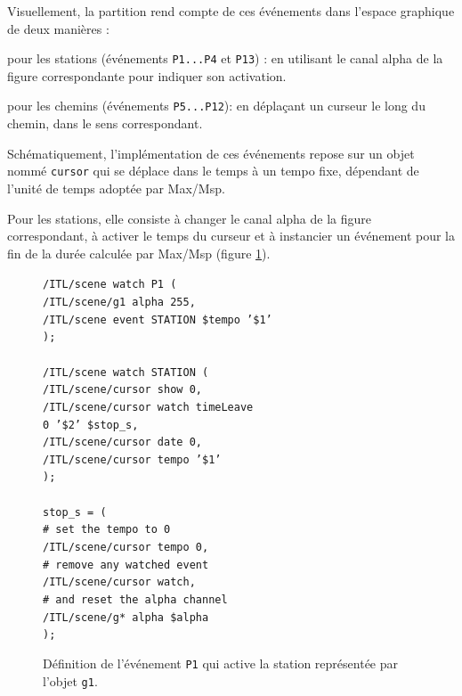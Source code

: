 \documentclass{article}
\newcommand{\OSC}[1]	{{\fontsize{9pt}{9pt} \selectfont\texttt{#1}}}
\let\olditemize\itemize
\let\oldenditemize\enditemize
\renewenvironment{itemize} 	{\olditemize \renewcommand{\labelitemi}{$\bullet$} \setlength{\itemsep}{0mm}}{\oldenditemize}
\newcommand{\sample}[1]		{\vspace{-0.2em}\begin{center}\colorbox{mygrey}{\begin{minipage}[t]{0.98\columnwidth} {\small \texttt{#1}}\end{minipage}}\end{center}}
\begin{document}
\vspace{2mm}
Visuellement, la partition rend compte de ces événements dans l'espace graphique de deux manières :
\begin{itemize}
\item pour les stations (événements \OSC{P1...P4} et \OSC{P13}) : en utilisant le canal alpha de la figure correspondante pour indiquer son activation.
\item pour les chemins (événements \OSC{P5...P12}): en déplaçant un curseur le long du chemin, dans le sens correspondant.
\end{itemize}

Schématiquement, l'implémentation de ces événements repose sur un objet nommé \OSC{cursor} qui se déplace dans le temps à un tempo fixe, dépendant de l'unité de temps adoptée par Max/Msp. 

Pour les stations, elle consiste à changer le canal alpha de la figure correspondant, à activer le temps du curseur et à instancier un événement pour la fin de la durée calculée par Max/Msp (figure \ref{fig:station}). 
\begin{figure}[h]
   \centering
\sample{/ITL/scene watch P1 ( \\
\hspace*{4mm}/ITL/scene/g1 alpha 255, \\
\hspace*{4mm}/ITL/scene event STATION \$tempo '\$1' \\
); \\
\\
/ITL/scene watch STATION ( \\
\hspace*{4mm}/ITL/scene/cursor show 0,\\
\hspace*{4mm}/ITL/scene/cursor watch timeLeave \\
\hspace*{30mm}0 '\$2' \$stop\_s,\\
\hspace*{4mm}/ITL/scene/cursor date 0,\\
\hspace*{4mm}/ITL/scene/cursor tempo '\$1'\\
); \\
\\
stop\_s = ( \\
\hspace*{4mm}\# set the tempo to 0 \\
\hspace*{4mm}/ITL/scene/cursor tempo 0, \\
\hspace*{4mm}\# remove any watched event \\
\hspace*{4mm}/ITL/scene/cursor watch,  \\
\hspace*{4mm}\# and reset the alpha channel \\
\hspace*{4mm}/ITL/scene/g* alpha \$alpha \\
);
}
   \caption{Définition de l'événement \OSC{P1} qui active la station représentée par l'objet \OSC{g1}.}
   \label{fig:station}
\end{figure}
\end{document}
